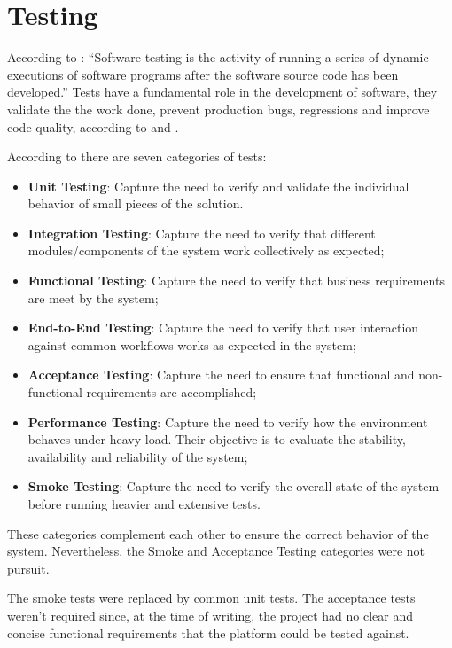 \section{Testing}
\label{sec:implementation:testing}

According to \cite{booktest}: ``Software testing is the activity of running a series of dynamic executions of software programs after the software source code has been developed.''
Tests have a fundamental role in the development of software, they validate the the work done, prevent production bugs, regressions and improve code quality, according to \cite{linuxtest} and \cite{imbtest}.

According to \cite{typetest} there are seven categories of tests:

\begin{itemize}
    \item \textbf{Unit Testing}: Capture the need to verify and validate the individual behavior of small pieces of the solution.
    \item \textbf{Integration Testing}: Capture the need to verify that different modules/components of the system work collectively as expected;
    \item \textbf{Functional Testing}: Capture the need to verify that business requirements are meet by the system;
    \item \textbf{End-to-End Testing}: Capture the need to verify that user interaction against common workflows works as expected in the system;
    \item \textbf{Acceptance Testing}: Capture the need to ensure that functional and non-functional requirements are accomplished;
    \item \textbf{Performance Testing}: Capture the need to verify how the environment behaves under heavy load. Their objective is to evaluate the stability, availability and reliability of the system;
    \item \textbf{Smoke Testing}: Capture the need to verify the overall state of the system before running heavier and extensive tests.
\end{itemize}

These categories complement each other to ensure the correct behavior of the system. Nevertheless, the Smoke and Acceptance Testing categories were not pursuit.

The smoke tests were replaced by common unit tests. The acceptance tests weren't required since, at the time of writing, the project had no clear and concise functional requirements that the platform could be tested against.

